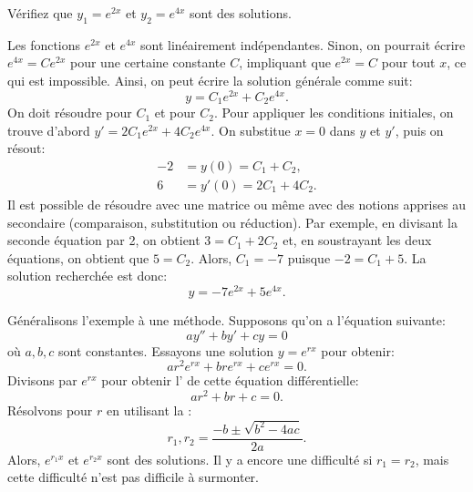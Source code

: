 \begin{exercise}
	Vérifiez que $y_1= e^{2x}$ et $y_2= e^{4x}$ sont des solutions.
\end{exercise}

Les fonctions  $e^{2x}$ et $e^{4x}$ sont linéairement indépendantes. 
Sinon, on pourrait  écrire  $e^{4x} = C e^{2x}$ pour une certaine constante $C$,
impliquant que $e^{2x} = C$ pour tout $x$, ce qui est impossible. 
Ainsi, on peut écrire la solution générale comme suit:
\begin{equation*}
	y = C_1 e^{2x} + C_2 e^{4x} .
\end{equation*}
On doit résoudre pour $C_1$ et pour $C_2$.  Pour appliquer les conditions initiales,
on trouve d'abord $y' = 2 C_1 e^{2x} + 4 C_2 e^{4x}$.  On substitue $x=0$ dans
$y$ et $y'$, puis on résout: 
\begin{align*}
	-2 & = y(0) = C_1 + C_2 , \\
 	 6 & = y'(0) = 2 C_1 + 4 C_2 .
\end{align*}
Il est possible de résoudre avec une matrice ou même avec des notions apprises au secondaire (comparaison, substitution ou réduction). Par exemple, en divisant la seconde équation par 2, on obtient $3 = C_1 + 2 C_2$ et, en soustrayant les deux équations, on obtient que $5 = C_2$.  
Alors, $C_1 = -7$ puisque $-2 = C_1 + 5$.  La solution recherchée est donc:
\begin{equation*}
y = -7 e^{2x} + 5 e^{4x} .
\end{equation*}

\medskip

Généralisons l'exemple à une méthode. Supposons qu'on a l'équation suivante:
\begin{equation} \label{ccsol:eq}
a y'' + b y' + c y = 0 
\end{equation}
où $a, b, c$ sont constantes.  Essayons une solution  $y = e^{rx}$ pour obtenir:   
\begin{equation*}
a r^2 e^{rx} + 
b r e^{rx} + 
c e^{rx} = 0 .
\end{equation*}
Divisons par  $e^{rx}$ pour obtenir  
l'\emph{} de cette équation différentielle:
\begin{equation*}
a r^2 + 
b r + 
c = 0 .
\end{equation*}
Résolvons pour $r$ en utilisant la  : 
\begin{equation*}
r_1, r_2 = \frac{-b \pm \sqrt{b^2 - 4ac}}{2a} .
\end{equation*}
Alors, $e^{r_1 x}$ et $e^{r_2 x}$ sont des solutions.  Il y a encore une difficulté si $r_1 = r_2$, mais cette difficulté n'est pas difficile à surmonter.  


